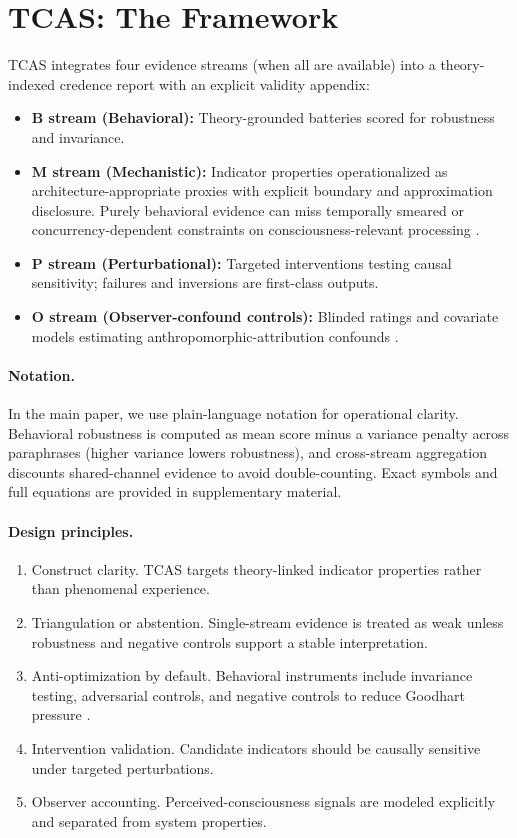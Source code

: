 \documentclass[letterpaper]{article}
\begin{document}
\section{TCAS: The Framework}

TCAS integrates four evidence streams (when all are available) into a theory-indexed credence report with an explicit validity appendix:
\begin{itemize}
    \item \textbf{B stream (Behavioral):} Theory-grounded batteries scored for robustness and invariance.
    \item \textbf{M stream (Mechanistic):} Indicator properties operationalized as architecture-appropriate proxies with explicit boundary and approximation disclosure. Purely behavioral evidence can miss temporally smeared or concurrency-dependent constraints on consciousness-relevant processing \citep{bennett2026}.
    \item \textbf{P stream (Perturbational):} Targeted interventions testing causal sensitivity; failures and inversions are first-class outputs.
    \item \textbf{O stream (Observer-confound controls):} Blinded ratings and covariate models estimating anthropomorphic-attribution confounds \citep{gray2007,kang2025}.
\end{itemize}

\paragraph{Notation.}
In the main paper, we use plain-language notation for operational clarity. Behavioral robustness is computed as mean score minus a variance penalty across paraphrases (higher variance lowers robustness), and cross-stream aggregation discounts shared-channel evidence to avoid double-counting. Exact symbols and full equations are provided in supplementary material.

\paragraph{Design principles.}
\begin{enumerate}
    \item Construct clarity. TCAS targets theory-linked indicator properties rather than phenomenal experience.
    \item Triangulation or abstention. Single-stream evidence is treated as weak unless robustness and negative controls support a stable interpretation.
    \item Anti-optimization by default. Behavioral instruments include invariance testing, adversarial controls, and negative controls to reduce Goodhart pressure \citep{bennett2025,manheim2018}.
    \item Intervention validation. Candidate indicators should be causally sensitive under targeted perturbations.
    \item Observer accounting. Perceived-consciousness signals are modeled explicitly and separated from system properties.
\end{enumerate}
\end{document}
